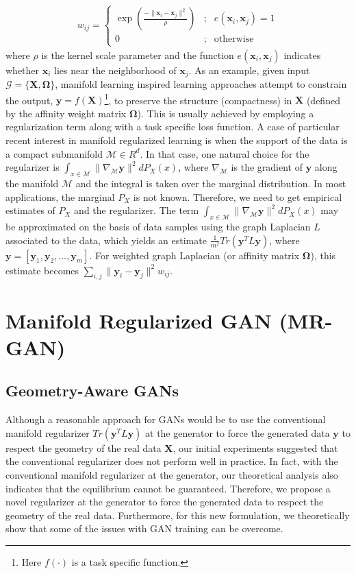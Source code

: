 \documentclass[10pt,twocolumn,letterpaper]{article}
\newcommand{\M}{\mathcal{M}}
\begin{document}
\begin{align}\label{weight}
w_{ij}=\left\{\begin{matrix}
\exp\left ( \frac{-\|\mathbf{x}_{i}-\mathbf{x}_{j}\|^2}{\rho} \right ) & ; & e(\mathbf{x}_{i},\mathbf{x}_{j})=1\\ 
0& ; & \text{otherwise}
\end{matrix}\right.
\end{align}
where $\rho$ is  the kernel  scale parameter and the function $e(\mathbf{x}_{i},\mathbf{x}_{j})$ indicates whether $\mathbf{x}_{i}$ lies near the neighborhood of $\mathbf{x}_{j}$. 
As an example, given input $\mathcal{G}=\{\mathbf{X},\mathbf{\Omega}\}$, manifold learning inspired learning approaches attempt to constrain the output, $\mathbf{y}=f(\mathbf{X})$\footnote{Here $f(\cdot)$ is a task specific function.}, to preserve the structure (compactness) in $\mathbf{X}$ (defined by the affinity weight matrix $\mathbf{\Omega}$). This is usually achieved by employing a regularization term along with a task specific loss function.
A case of particular recent interest in manifold regularized learning is when the support of the data is a compact submanifold $\mathcal{M}\in R^d$. In that case, one natural choice for the regularizer is $\int_{x\in \mathcal{M}}\|\nabla _{\mathcal{M}} \mathbf{y}\|^2dP_X(x)$, where $\nabla _{\mathcal{M}}$ is the gradient of $\mathbf y$ along the manifold $\mathcal{M}$ and the integral is taken over the marginal distribution. In most applications, the marginal $P_X$ is not known. Therefore, we need to get empirical estimates
of $P_X$ and the regularizer. The term
$\int_{x\in \mathcal{M}}\|\nabla _{\mathcal{M}} \mathbf{y}\|^2dP_X(x)$ may be approximated on the basis of data samples
using the graph Laplacian  $L$ associated to the data, which yields an estimate $\frac{1}{m^2}Tr(\mathbf y^TL\mathbf y)$, where $\mathbf{y}=[\mathbf{y}_1, \mathbf{y}_2,\ldots, \mathbf{y}_m]$.
For weighted graph Laplacian (or affinity matrix $\mathbf{\Omega}$), this estimate becomes $\sum \limits _{i,j} \|\mathbf{y}_{i}-\mathbf{y}_{j}\|^2w_{ij}$.



\section{Manifold Regularized GAN (MR-GAN)}
\subsection{Geometry-Aware GANs}{{Although a reasonable approach for GANs would be to use the conventional manifold regularizer $Tr(\mathbf{y}^TL\mathbf{y})$ at the generator to force the generated data $\mathbf{y}$ to respect the geometry of the real data $\mathbf{X}$, our initial experiments suggested that the conventional regularizer does not perform well in practice. In fact, with the conventional manifold regularizer %
		at the generator, our theoretical analysis also indicates that the equilibrium cannot be guaranteed. Therefore, we propose a novel regularizer at the generator to force the generated data to respect the geometry of the real data. Furthermore, for this new formulation, we theoretically show that some of the issues with GAN training can be overcome.}}
\end{document}
